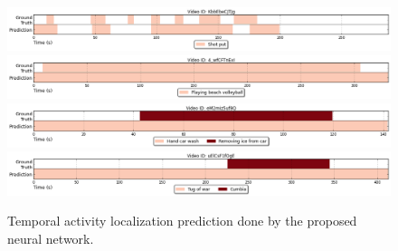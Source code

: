 \begin{figure}[H]
\begin{center}
\includegraphics[width=1\linewidth]{img/results/activity_detection/activity_temporal_localization_20}
\includegraphics[width=1\linewidth]{img/results/activity_detection/activity_temporal_localization_21}
\includegraphics[width=1\linewidth]{img/results/activity_detection/activity_temporal_localization_22}
\includegraphics[width=1\linewidth]{img/results/activity_detection/activity_temporal_localization_23}
\end{center}
\caption{Temporal activity localization prediction done by the proposed neural network.}
\label{fig:results_visualization_detection_annex_1}
\end{figure}

